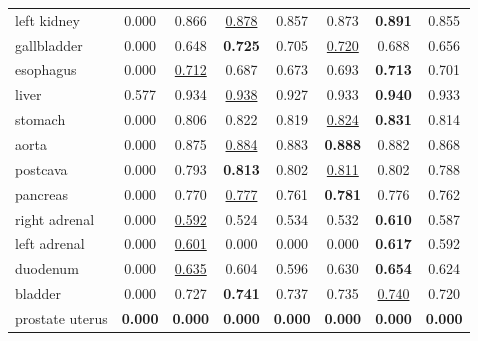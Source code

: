 \begin{minipage}{\textwidth}
{\begin{tabular}{@{}lccccccc@{}}
left kidney & 0.000 & 0.866 & \underline{0.878} & 0.857 & 0.873 & \textbf{0.891} & 0.855 \\
gallbladder & 0.000 & 0.648 & \textbf{0.725} & 0.705 & \underline{0.720} & 0.688 & 0.656 \\
esophagus & 0.000 & \underline{0.712} & 0.687 & 0.673 & 0.693 & \textbf{0.713} & 0.701 \\
liver & 0.577 & 0.934 & \underline{0.938} & 0.927 & 0.933 & \textbf{0.940} & 0.933 \\
stomach & 0.000 & 0.806 & 0.822 & 0.819 & \underline{0.824} & \textbf{0.831} & 0.814 \\
aorta & 0.000 & 0.875 & \underline{0.884} & 0.883 & \textbf{0.888} & 0.882 & 0.868 \\
postcava & 0.000 & 0.793 & \textbf{0.813} & 0.802 & \underline{0.811} & 0.802 & 0.788 \\
pancreas & 0.000 & 0.770 & \underline{0.777} & 0.761 & \textbf{0.781} & 0.776 & 0.762 \\
right adrenal & 0.000 & \underline{0.592} & 0.524 & 0.534 & 0.532 & \textbf{0.610} & 0.587 \\
left adrenal & 0.000 & \underline{0.601} & 0.000 & 0.000 & 0.000 & \textbf{0.617} & 0.592 \\
duodenum & 0.000 & \underline{0.635} & 0.604 & 0.596 & 0.630 & \textbf{0.654} & 0.624 \\
bladder & 0.000 & 0.727 & \textbf{0.741} & 0.737 & 0.735 & \underline{0.740} & 0.720 \\
prostate uterus & \textbf{0.000} & \textbf{0.000} & \textbf{0.000} & \textbf{0.000} & \textbf{0.000} & \textbf{0.000} & \textbf{0.000} \\
\bottomrule
\end{tabular}
}\end{minipage}
\par\bigskip
